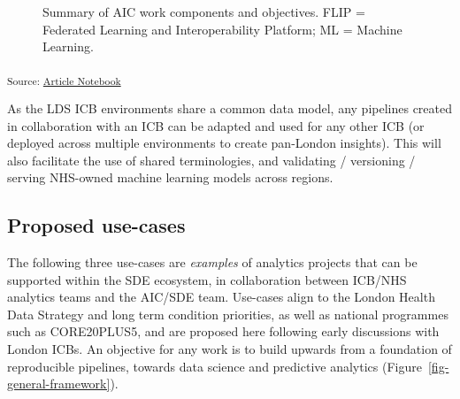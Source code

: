 \documentclass[
  letterpaper,
  DIV=11,
  numbers=noendperiod]{scrartcl}
\begin{document}
\begin{figure}


\caption{\label{fig-aic-objectives}Summary of AIC work components and
objectives. FLIP = Federated Learning and Interoperability Platform; ML
= Machine Learning.}

\end{figure}%

\textsubscript{Source:
\href{https://d3london.github.io/sde_aic_docs/index.qmd.html}{Article
Notebook}}

As the LDS ICB environments share a common data model, any pipelines
created in collaboration with an ICB can be adapted and used for any
other ICB (or deployed across multiple environments to create pan-London
insights). This will also facilitate the use of shared terminologies,
and validating / versioning / serving NHS-owned machine learning models
across regions.

\subsection{Proposed use-cases}\label{proposed-use-cases}

The following three use-cases are \emph{examples} of analytics projects
that can be supported within the SDE ecosystem, in collaboration between
ICB/NHS analytics teams and the AIC/SDE team. Use-cases align to the
London Health Data Strategy and long term condition priorities, as well
as national programmes such as CORE20PLUS5, and are proposed here
following early discussions with London ICBs. An objective for any work
is to build upwards from a foundation of reproducible pipelines, towards
data science and predictive analytics
(Figure~\ref{fig-general-framework}).
\end{document}
